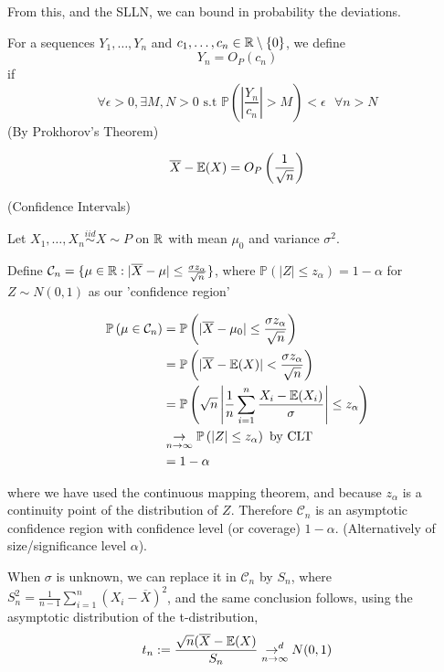 \documentclass[a4paper]{article}
\begin{document}
From this, and the SLLN, we can bound in probability the deviations.

\begin{defn}
	For a sequences $Y_1, \ldots, Y_n$ and $c_1, \ldots, c_n \in \mathbb{R}\setminus\{0\}$, we define 
	 \[
		 Y_n = O_{P}(c_n)
	\]
	if
	\[
		\forall \epsilon > 0, \exists M,N > 0 \text{ s.t } \mathbb{P}\left( \left| \frac{Y_n}{c_n} \right| > M \right) < \epsilon \text{  } \forall n > N
	\] (By Prokhorov's Theorem) 
\end{defn}

\begin{corol}
	\[
		\overline{X} - \mathbb{E}(X) = O_P \left(\frac{1}{\sqrt{n} }\right)
	\] 
\end{corol}

\begin{eg} (Confidence Intervals)

	Let $X_1, \ldots, X_n \stackrel{iid}{\sim} X \sim P$ on $\mathbb{R}$ with mean  $\mu_{0}$ and variance $\sigma^2$.

	Define  $\mathcal{C}_n = \{\mu \in \mathbb{R} : |\overline{X} - \mu| \le \frac{\sigma z_{\alpha}}{\sqrt{n} }\} $, where $\mathbb{P}\left( |Z| \le z_{\alpha} \right) = 1 - \alpha $ for $Z\sim N(0,1)$ as our 'confidence region'

	\begin{align*}
		\mathbb{P}\left( \mu \in \mathcal{C}_n \right) &= \mathbb{P}\left( |\overline{X} - \mu_0| \le \frac{\sigma z_{\alpha}}{\sqrt{n} }  \right) \\
		&= \mathbb{P}\left( |\overline{X} - \mathbb{E}(X)| < \frac{\sigma z_{\alpha}}{\sqrt{n} } \right) \\
		&= \mathbb{P}\left( \sqrt{n} \left| \frac{1}{n} \sum_{i=1}^{n} \frac{X_i - \mathbb{E}(X_i)}{\sigma} \right| \le z_{\alpha} \right) \\
		&\underset{n \to \infty}{\to } \mathbb{P}\left( |Z| \le z_{\alpha} \right) \text{ by CLT} \\
		&= 1- \alpha
	\end{align*}

	where we have used the continuous mapping theorem, and because $z_{\alpha}$ is a continuity point of the distribution of $Z$. Therefore $\mathcal{C}_n$ is an asymptotic confidence region with confidence level (or coverage) $1-\alpha$. (Alternatively of size/significance level  $\alpha$).

	When  $\sigma$ is unknown, we can replace it in $\mathcal{C}_n$ by $S_n$, where  $S_{n}^2 = \frac{1}{n-1} \sum_{i=1}^{n}(X_i - \overline{X})^2$, and the same conclusion follows, using the asymptotic distribution of the t-distribution,
	\[
		t_n := \frac{\sqrt{n} (\overline{X} - \mathbb{E}(X)}{S_n} \underset{n \to \infty}{\to ^{d}} N(0,1)
	\] 
\end{eg}
\end{document}
